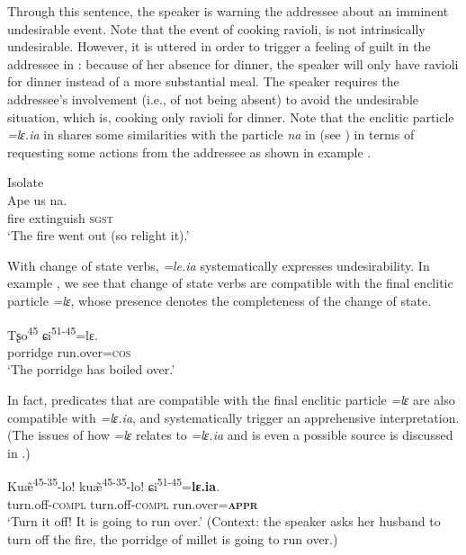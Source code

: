 \documentclass[output=paper,colorlinks,citecolor=brown, language=chinese]{langscibook}
\begin{document}
\noindent Through this sentence, the speaker is warning the addressee about an imminent undesirable event. Note that the event of cooking ravioli, is not intrinsically undesirable. However, it is uttered in order to trigger a feeling of guilt in the addressee in : because of her absence for dinner, the speaker will only have ravioli for dinner instead of a more substantial meal. The speaker requires the addressee's involvement (i.e., of not being absent) to avoid the undesirable situation, which is, cooking only ravioli for dinner. Note that the enclitic particle \textit{=lɛ.ia} in  shares some similarities with the particle \textit{na} in  (see \cite[176-177]{Tamura2000}) in terms of requesting some actions from the addressee as shown in example .

\ea\label{ex:Song17}
 {Isolate} {\cite[176]{Tamura2000}} \\
\gll Ape us na. \\
fire extinguish \textsc{sgst} \\
\glt `The fire went out (so relight it).'
\z

 With change of state verbs,  \textit{=le.ia} systematically expresses undesirability. In example , we see that change of state verbs are compatible with the final enclitic particle \textit{=lɛ}, whose presence denotes the completeness of the change of state. 


\ea\label{ex:Song18}
\gll Tʂo\textsuperscript{45} ɕi\textsuperscript{51-45}=lɛ. \\
porridge run.over=\textsc{cos} \\
\glt `The porridge has boiled over.'
\z

\noindent In fact, predicates that are compatible with the final enclitic particle \textit{=lɛ} are also compatible with \textit{=lɛ.ia}, and systematically trigger an apprehensive interpretation. (The issues of how \textit{=lɛ} relates to \textit{=lɛ.ia} and is even a possible source is discussed in .)

\ea\label{ex:Song19}
\gll Ku\~æ\textsuperscript{45-35}-lo! ku\~æ\textsuperscript{45-35}-lo! ɕi\textsuperscript{51-45}=\textbf{lɛ.ia}. \\
turn.off-\textsc{compl} turn.off-\textsc{compl} run.over=\textsc{\textbf{appr}} \\
\glt `Turn it off! It is going to run over.' (Context: the speaker asks her husband to turn off the fire, the porridge of millet is going to run over.)
\z
\end{document}
